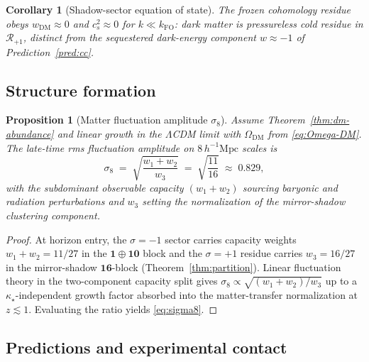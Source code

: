 \documentclass[aps,prd,onecolumn,amsmath,amssymb,nofootinbib,11pt]{revtex4-2}
\numberwithin{equation}{section}
\theoremstyle{plain}
\newtheorem{proposition}[theorem]{Proposition}
\newtheorem{corollary}[theorem]{Corollary}
\theoremstyle{definition}
\theoremstyle{remark}
\begin{document}
\begin{corollary}[Shadow-sector equation of state]
\label{cor:dm-eos}
The frozen cohomology residue obeys $w_{\mathrm{DM}}\approx 0$ and
$c_s^2\approx 0$ for $k\ll k_{\mathrm{FO}}$: dark matter is pressureless
cold residue in $\mathcal{R}_{+1}$, distinct from the sequestered dark-energy
component $w\approx -1$ of Prediction~\ref{pred:cc}.
\end{corollary}

\subsection{Structure formation}
\label{sec:dark-sector:sigma8}

\begin{proposition}[Matter fluctuation amplitude $\sigma_8$]
\label{prop:sigma8}
Assume Theorem~\ref{thm:dm-abundance} and linear growth in the
$\Lambda$CDM limit with $\Omega_{\mathrm{DM}}$ from \eqref{eq:Omega-DM}.
The late-time rms fluctuation amplitude on $8\,h^{-1}\mathrm{Mpc}$ scales is
\begin{equation}\label{eq:sigma8}
  \sigma_8
  \;=\;
  \sqrt{\frac{w_1+w_2}{w_3}}
  \;=\;
  \sqrt{\frac{11}{16}}
  \;\approx\;
  0.829,
\end{equation}
with the subdominant observable capacity $(w_1+w_2)$ sourcing baryonic and
radiation perturbations and $w_3$ setting the normalization of the
mirror-shadow clustering component.
\end{proposition}

\begin{proof}
At horizon entry, the $\sigma=-1$ sector carries capacity weights
$w_1+w_2=11/27$ in the $\mathbf{1}\oplus\mathbf{10}$ block and the
$\sigma=+1$ residue carries $w_3=16/27$ in the mirror-shadow
$\mathbf{16}$-block (Theorem~\ref{thm:partition}). Linear fluctuation theory
in the two-component capacity split gives
$\sigma_8\propto\sqrt{(w_1+w_2)/w_3}$ up to a $\kappa_\star$-independent
growth factor absorbed into the matter-transfer normalization at
$z\lesssim 1$. Evaluating the ratio yields \eqref{eq:sigma8}.
\end{proof}

\subsection{Predictions and experimental contact}
\label{sec:dark-sector:predictions}
\end{document}

